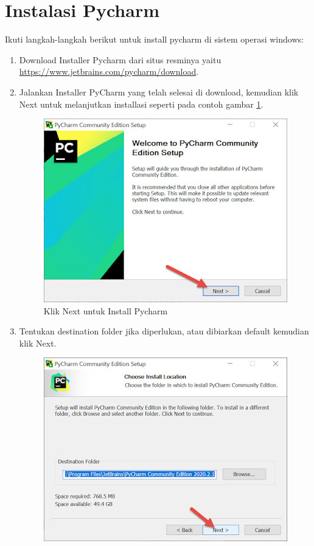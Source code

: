 \section{Instalasi Pycharm}
Ikuti langkah-langkah berikut untuk install pycharm di sistem operasi windows:
\begin{enumerate}
\item Download Installer Pycharm dari situs resminya yaitu \\ \small \url{https://www.jetbrains.com/pycharm/download}.
\item Jalankan Installer PyCharm yang telah selesai di download, kemudian klik Next untuk melanjutkan installasi seperti pada contoh gambar \ref{installpycharm}.
\begin{figure}[H]
\centering
\includegraphics[scale=.65]{figures/install_pycharm1}
\caption{Klik Next untuk Install Pycharm}
\label{installpycharm}
\end{figure}
\item Tentukan destination folder jika diperlukan, atau dibiarkan default kemudian klik Next.
\begin{figure}[H]
\centering
\includegraphics[scale=.65]{figures/install_pycharm2}

\end{figure}
\end{enumerate}
